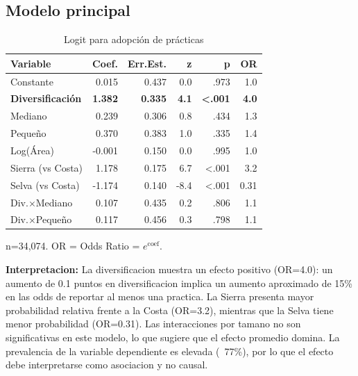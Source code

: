 \documentclass[10pt,a4paper]{article}
\begin{document}
\subsection{Modelo principal}

\begin{table}[H]
\centering
\caption{Logit para adopción de prácticas}
\label{tab:logit_main}
\begin{threeparttable}
\small
\begin{tabular}{lrrrrr}
\toprule
\textbf{Variable} & \textbf{Coef.} & \textbf{Err.Est.} & \textbf{z} & \textbf{p} & \textbf{OR} \\
\midrule
Constante & 0.015 & 0.437 & 0.0 & .973 & 1.0 \\
\textbf{Diversificación} & \textbf{1.382} & \textbf{0.335} & \textbf{4.1} & \textbf{<.001} & \textbf{4.0} \\
Mediano & 0.239 & 0.306 & 0.8 & .434 & 1.3 \\
Pequeño & 0.370 & 0.383 & 1.0 & .335 & 1.4 \\
Log(Área) & -0.001 & 0.150 & 0.0 & .995 & 1.0 \\
Sierra (vs Costa) & 1.178 & 0.175 & 6.7 & <.001 & 3.2 \\
Selva (vs Costa) & -1.174 & 0.140 & -8.4 & <.001 & 0.31 \\
\midrule
Div.$\times$Mediano & 0.107 & 0.435 & 0.2 & .806 & 1.1 \\
Div.$\times$Pequeño & 0.117 & 0.456 & 0.3 & .798 & 1.1 \\
\bottomrule
\end{tabular}
\begin{tablenotes}
\footnotesize
\item n=34,074. OR = Odds Ratio = $e^{\text{coef}}$.
\end{tablenotes}
\end{threeparttable}
\end{table}

\textbf{Interpretacion:} La diversificacion muestra un efecto positivo (OR=4.0): un aumento de 0.1 puntos en diversificacion implica un aumento aproximado de 15\% en las odds de reportar al menos una practica. La Sierra presenta mayor probabilidad relativa frente a la Costa (OR=3.2), mientras que la Selva tiene menor probabilidad (OR=0.31). Las interacciones por tamano no son significativas en este modelo, lo que sugiere que el efecto promedio domina. La prevalencia de la variable dependiente es elevada (~77\%), por lo que el efecto debe interpretarse como asociacion y no causal.
\end{document}
